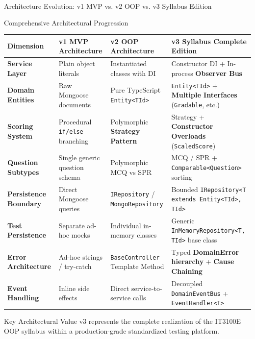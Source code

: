 ﻿\documentclass[aspectratio=169,10pt,t]{beamer}
\begin{document}
\begin{frame}{Architecture Evolution: v1 MVP vs. v2 OOP vs. v3 Syllabus Edition}
  \vspace{0.4mm}
  \begin{infoCard}{Comprehensive Architectural Progression}
    \fontsize{5.0pt}{6.0pt}\selectfont
    \renewcommand{\arraystretch}{0.95}
    \begin{tabular}{@{}p{18mm}p{28mm}p{34mm}p{44mm}@{}}
      \toprule
      \textbf{Dimension} & \textbf{v1 MVP Architecture} & \textbf{v2 OOP Architecture} & \textbf{v3 Syllabus Complete Edition} \\
      \midrule
      \textbf{Service Layer} & Plain object literals & Instantiated classes with DI & Constructor DI + In-process \textbf{Observer Bus} \\
      \textbf{Domain Entities} & Raw Mongoose documents & Pure TypeScript \texttt{Entity<TId>} & \texttt{Entity<TId>} + \textbf{Multiple Interfaces} (\texttt{Gradable}, etc.) \\
      \textbf{Scoring System} & Procedural \texttt{if/else} branching & Polymorphic \textbf{Strategy Pattern} & Strategy + \textbf{Constructor Overloads} (\texttt{ScaledScore}) \\
      \textbf{Question Subtypes} & Single generic question schema & Polymorphic MCQ vs SPR & MCQ / SPR + \texttt{Comparable<Question>} sorting \\
      \textbf{Persistence Boundary} & Direct Mongoose queries & \texttt{IRepository} / \texttt{MongoRepository} & Bounded \lstinline|IRepository<T extends Entity<TId>, TId>| \\
      \textbf{Test Persistence} & Separate ad-hoc mocks & Individual in-memory classes & Generic \lstinline|InMemoryRepository<T, TId>| base class \\
      \textbf{Error Architecture} & Ad-hoc strings / try-catch & \texttt{BaseController} Template Method & Typed \textbf{DomainError hierarchy} + \textbf{Cause Chaining} \\
      \textbf{Event Handling} & Inline side effects & Direct service-to-service calls & Decoupled \texttt{DomainEventBus} + \texttt{EventHandler<T>} \\
      \bottomrule
    \end{tabular}
  \end{infoCard}

  \vspace{0.8mm}
  \begin{hlCard}{Key Architectural Value}
    v3 represents the complete realization of the IT3100E OOP syllabus within a production-grade standardized testing platform.
  \end{hlCard}
\end{frame}
\end{document}
